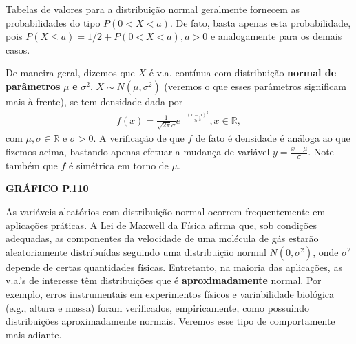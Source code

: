 \documentclass[../Notas.tex]{subfiles}
\begin{document}
\begin{example}
\begin{remark}
Tabelas de valores para a distribuição normal geralmente fornecem as probabilidades do tipo $P(0 < X < a)$. De fato, basta apenas esta probabilidade, pois $P(X\leq a) = 1/2 + P(0 < X < a), a>0$ e analogamente para os demais casos.
\end{remark}
De maneira geral, dizemos que $X$ é v.a. contínua com distribuição \textbf{normal de parâmetros} $\mu$ \textbf{e} $\sigma^2$, $X\sim N(\mu, \sigma^2)$ (veremos o que esses parâmetros significam mais à frente), se tem densidade dada por
\begin{align*}
    f(x) = \frac{1}{\sqrt{2\pi}\sigma}e^{-\frac{(x-\mu)^2}{2\sigma^2}}, x\in\mathbb{R},
\end{align*}
com $\mu,\sigma\in\mathbb{R}$ e $\sigma>0$. A verificação de que $f$ de fato é densidade é análoga ao que fizemos acima, bastando apenas efetuar a mudança de variável $y = \displaystyle{\frac{x-\mu}{\sigma}}$. Note também que $f$ é simétrica em torno de $\mu$.
\begin{center}
    \textbf{GRÁFICO P.110}
\end{center}
As variáveis aleatórios com distribuição normal ocorrem frequentemente em aplicações práticas. A Lei de Maxwell da Física afirma que, sob condições adequadas, as componentes da velocidade de uma molécula de gás estarão aleatoriamente distribuídas seguindo uma distribuição normal $N(0,\sigma^2)$, onde $\sigma^2$ depende de certas quantidades físicas. Entretanto, na maioria das aplicações, as v.a.'s de interesse têm distribuições que é \textbf{aproximadamente} normal. Por exemplo, erros instrumentais em experimentos físicos e variabilidade biológica (e.g., altura e massa) foram verificados, empiricamente, como possuindo distribuições aproximadamente normais. Veremos esse tipo de comportamente mais adiante.
\end{example}
\end{document}
